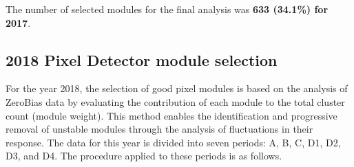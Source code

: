 The number of selected modules for the final analysis was \textbf{633 (34.1\%) for 2017}.


\subsection{2018 Pixel Detector module selection}
\label{sec:pcc_perf_moduleselection}



For the year 2018, the selection of good pixel modules is based on the analysis of ZeroBias data by evaluating the contribution of each module to the total cluster count (module weight). This method enables the identification and progressive removal of unstable modules through the analysis of fluctuations in their response. The data for this year is divided into seven periods: A, B, C, D1, D2, D3, and D4. The procedure applied to these periods is as follows.


